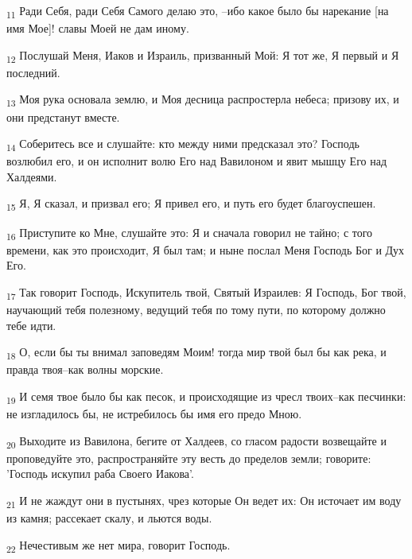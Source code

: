 \begin{tcolorbox}
\textsubscript{11} Ради Себя, ради Себя Самого делаю это, --ибо какое было бы нарекание [на имя Мое]! славы Моей не дам иному.
\end{tcolorbox}
\begin{tcolorbox}
\textsubscript{12} Послушай Меня, Иаков и Израиль, призванный Мой: Я тот же, Я первый и Я последний.
\end{tcolorbox}
\begin{tcolorbox}
\textsubscript{13} Моя рука основала землю, и Моя десница распростерла небеса; призову их, и они предстанут вместе.
\end{tcolorbox}
\begin{tcolorbox}
\textsubscript{14} Соберитесь все и слушайте: кто между ними предсказал это? Господь возлюбил его, и он исполнит волю Его над Вавилоном и явит мышцу Его над Халдеями.
\end{tcolorbox}
\begin{tcolorbox}
\textsubscript{15} Я, Я сказал, и призвал его; Я привел его, и путь его будет благоуспешен.
\end{tcolorbox}
\begin{tcolorbox}
\textsubscript{16} Приступите ко Мне, слушайте это: Я и сначала говорил не тайно; с того времени, как это происходит, Я был там; и ныне послал Меня Господь Бог и Дух Его.
\end{tcolorbox}
\begin{tcolorbox}
\textsubscript{17} Так говорит Господь, Искупитель твой, Святый Израилев: Я Господь, Бог твой, научающий тебя полезному, ведущий тебя по тому пути, по которому должно тебе идти.
\end{tcolorbox}
\begin{tcolorbox}
\textsubscript{18} О, если бы ты внимал заповедям Моим! тогда мир твой был бы как река, и правда твоя--как волны морские.
\end{tcolorbox}
\begin{tcolorbox}
\textsubscript{19} И семя твое было бы как песок, и происходящие из чресл твоих--как песчинки: не изгладилось бы, не истребилось бы имя его предо Мною.
\end{tcolorbox}
\begin{tcolorbox}
\textsubscript{20} Выходите из Вавилона, бегите от Халдеев, со гласом радости возвещайте и проповедуйте это, распространяйте эту весть до пределов земли; говорите: 'Господь искупил раба Своего Иакова'.
\end{tcolorbox}
\begin{tcolorbox}
\textsubscript{21} И не жаждут они в пустынях, чрез которые Он ведет их: Он источает им воду из камня; рассекает скалу, и льются воды.
\end{tcolorbox}
\begin{tcolorbox}
\textsubscript{22} Нечестивым же нет мира, говорит Господь.
\end{tcolorbox}
